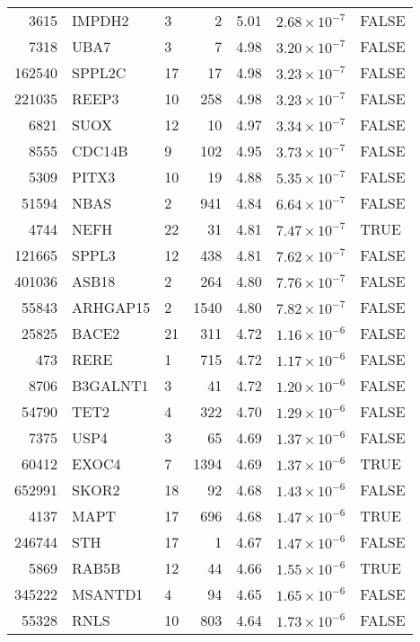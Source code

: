 \begin{table}[ht]
\begin{adjustbox}{totalheight=10in}
\begin{tabular}{rllrrrl}
  3615 & IMPDH2 & 3 &   2 & 5.01 & $2.68 \times 10^{-7}$ & FALSE \\ 
  7318 & UBA7 & 3 &   7 & 4.98 & $3.20 \times 10^{-7}$ & FALSE \\ 
  162540 & SPPL2C & 17 &  17 & 4.98 & $3.23 \times 10^{-7}$ & FALSE \\ 
  221035 & REEP3 & 10 & 258 & 4.98 & $3.23 \times 10^{-7}$ & FALSE \\ 
  6821 & SUOX & 12 &  10 & 4.97 & $3.34 \times 10^{-7}$ & FALSE \\ 
  8555 & CDC14B & 9 & 102 & 4.95 & $3.73 \times 10^{-7}$ & FALSE \\ 
  5309 & PITX3 & 10 &  19 & 4.88 & $5.35 \times 10^{-7}$ & FALSE \\ 
  51594 & NBAS & 2 & 941 & 4.84 & $6.64 \times 10^{-7}$ & FALSE \\ 
  4744 & NEFH & 22 &  31 & 4.81 & $7.47 \times 10^{-7}$ & TRUE \\ 
  121665 & SPPL3 & 12 & 438 & 4.81 & $7.62 \times 10^{-7}$ & FALSE \\ 
  401036 & ASB18 & 2 & 264 & 4.80 & $7.76 \times 10^{-7}$ & FALSE \\ 
  55843 & ARHGAP15 & 2 & 1540 & 4.80 & $7.82 \times 10^{-7}$ & FALSE \\ 
  25825 & BACE2 & 21 & 311 & 4.72 & $1.16 \times 10^{-6}$ & FALSE \\ 
  473 & RERE & 1 & 715 & 4.72 & $1.17 \times 10^{-6}$ & FALSE \\ 
  8706 & B3GALNT1 & 3 &  41 & 4.72 & $1.20 \times 10^{-6}$ & FALSE \\ 
  54790 & TET2 & 4 & 322 & 4.70 & $1.29 \times 10^{-6}$ & FALSE \\ 
  7375 & USP4 & 3 &  65 & 4.69 & $1.37 \times 10^{-6}$ & FALSE \\ 
  60412 & EXOC4 & 7 & 1394 & 4.69 & $1.37 \times 10^{-6}$ & TRUE \\ 
  652991 & SKOR2 & 18 &  92 & 4.68 & $1.43 \times 10^{-6}$ & FALSE \\ 
  4137 & MAPT & 17 & 696 & 4.68 & $1.47 \times 10^{-6}$ & TRUE \\ 
  246744 & STH & 17 &   1 & 4.67 & $1.47 \times 10^{-6}$ & FALSE \\ 
  5869 & RAB5B & 12 &  44 & 4.66 & $1.55 \times 10^{-6}$ & TRUE \\ 
  345222 & MSANTD1 & 4 &  94 & 4.65 & $1.65 \times 10^{-6}$ & FALSE \\ 
  55328 & RNLS & 10 & 803 & 4.64 & $1.73 \times 10^{-6}$ & FALSE \\ 

\end{tabular}
\end{adjustbox}
\end{table}
